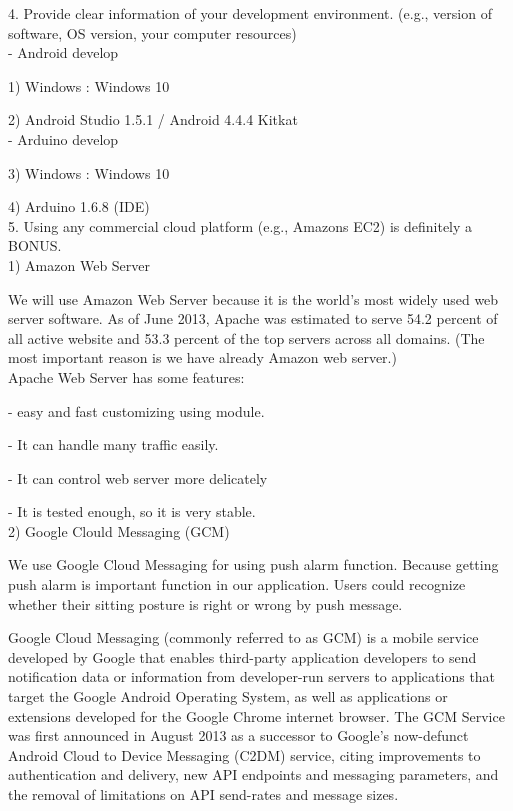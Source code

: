 \documentclass[conference]{IEEEtran}
\begin{document}
4.	Provide clear information of your development environment. (e.g., version of software, OS version, your computer resources)\\

-	Android develop

1)	Windows : Windows 10

2)	Android Studio 1.5.1 / Android 4.4.4 Kitkat\\

-	Arduino develop 

3)	Windows : Windows 10

4)	Arduino 1.6.8 (IDE)\\


5.	Using any commercial cloud platform (e.g., Amazons EC2) is definitely a BONUS.\\

1) Amazon Web Server

 We will use Amazon Web Server because it is the world's most widely used web server software. As of June 2013, Apache was estimated to serve 54.2 percent of all active website and 53.3 percent of the top servers across all domains. (The most important reason is we have already Amazon web server.)\\

Apache Web Server has some features:

- easy and fast customizing using module.

- It can handle many traffic easily.

- It can control web server more delicately

- It is tested enough, so it is very stable.\\

2) Google Clould Messaging (GCM)

 We use Google Cloud Messaging for using push alarm function. Because getting push alarm is important function in our application. Users could recognize whether their sitting posture is right or wrong by push message.  

Google Cloud Messaging (commonly referred to as GCM) is a mobile service developed by Google that enables third-party application developers to send notification data or information from developer-run servers to applications that target the Google Android Operating System, as well as applications or extensions developed for the Google Chrome internet browser. The GCM Service was first announced in August 2013 as a successor to Google's now-defunct Android Cloud to Device Messaging (C2DM) service, citing improvements to authentication and delivery, new API endpoints and messaging parameters, and the removal of limitations on API send-rates and message sizes.
\end{document}

